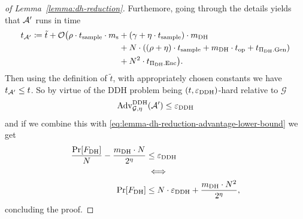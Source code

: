 \begin{proof}[of Lemma~\ref{lemma:dh-reduction}]
	Furthemore, going through the details yields that $\mathcal{A}'$ runs in time
	\begin{align*}
		\begin{split}
			t_{\mathcal{A}'} \coloneqq \tilde{t} + \mathcal{O}\big(\rho \cdot t_{\mathrm{sample}} \cdot m_\mathrm{s} & + (\gamma + \eta \cdot t_{\mathrm{sample}}) \cdot m_\mathrm{DH} \\
			& + N \cdot ((\rho + \eta) \cdot t_{\mathrm{sample}} + m_\mathrm{DH} \cdot t_{\mathrm{op}} + t_{\Pi_{\mathrm{DH}}.\mathrm{Gen}})  \\
			& +  N^2 \cdot t_{\Pi_{\mathrm{DH}}.\mathrm{Enc}}\big).
		\end{split}
	\end{align*}
	Then using the definition of $\tilde{t}$, with appropriately chosen constants we have $t_{\mathcal{A}'} \le t$. So by virtue of the DDH problem being $(t, \varepsilon_\mathrm{DDH})$-hard relative to $\mathcal{G}$
	\[
		\mathrm{Adv}_{\mathcal{G}, \eta}^{\mathrm{DDH}}(\mathcal{A}') \le \varepsilon_\mathrm{DDH}
	\]
	and if we combine this with \eqref{eq:lemma-dh-reduction-advantage-lower-bound} we get
	\begin{align*}
		\frac{\pr{\fdh}}{N} - \frac{\mdh \cdot N}{2^\eta} & \le \eddh                                          \\
		                                                  & \iff                                               \\
		\pr{\fdh}                                         & \le N \cdot \eddh + \frac{\mdh \cdot N^2}{2^\eta},
	\end{align*}
	concluding the proof.
\end{proof}
